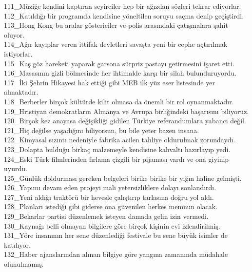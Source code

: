 111\_Müziğe kendini kaptıran seyirciler hep bir ağızdan sözleri tekrar ediyorlar.\\
112\_Katıldığı bir programda kendisine yöneltilen soruyu saçma denip geçiştirdi.\\
113\_Hong Kong bu aralar göstericiler ve polis arasındaki çatışmalara şahit oluyor.\\
114\_Ağır kayıplar veren ittifak devletleri savaşta yeni bir cephe açtırılmak istiyorlar.\\
115\_Kaş göz hareketi yaparak garsona sürpriz pastayı getirmesini işaret etti.\\
116\_Masasının gizli bölmesinde her ihtimalde karşı bir silah bulunduruyordu.\\
117\_İki Şehrin Hikayesi hak ettiği gibi MEB ilk yüz eser listesinde yer almaktadır.\\
118\_Berberler birçok kültürde kilit olmasa da önemli bir rol oynanmaktadır.\\
119\_Hristiyan demokratların Almanya ve Avrupa birliğindeki başarısını biliyoruz.\\
120\_Birçok kez anayasa değişikliği gidilen Türkiye referandumlara yabancı değil.\\
121\_Hiç değilse yaşadığını biliyorsun, bu bile yeter bazen insana.\\
122\_Kimyasal sızıntı nedeniyle fabrika acilen tahliye oldurulmak zorundaydı.\\
123\_Dolapta bulduğu birkaç malzemeyle kendisine kahvaltı hazırlayıp yedi.\\
124\_Eski Türk filmlerinden fırlama çizgili bir pijaması vardı ve ona giyinip uyurdu.\\
125\_Günlük doldurması gereken belgeleri birike birike bir yığın haline gelmişti.\\
126\_Yapımı devam eden projeyi mali yetersizliklere dolayı sonlandırdı.\\
127\_Yeni aldığı traktörü bir hevesle çalıştırıp tarlasına doğru yol aldı.\\
128\_Planları istediği gibi giderse ona güvenilen herkes memnun olacak.\\
129\_Bekarlar partisi düzenlemek isteyen damada gelin izin vermedi.\\
130\_Kaynağı belli olmayan bilgilere göre birçok kişinin evi izlendirilmiş.\\
131\_Yöre insanının her sene düzenlediği festivale bu sene büyük isimler de katılıyor.\\
132\_Haber ajanslarından alınan bilgiye göre yangına zamanında müdahale olunulmamış.\\

